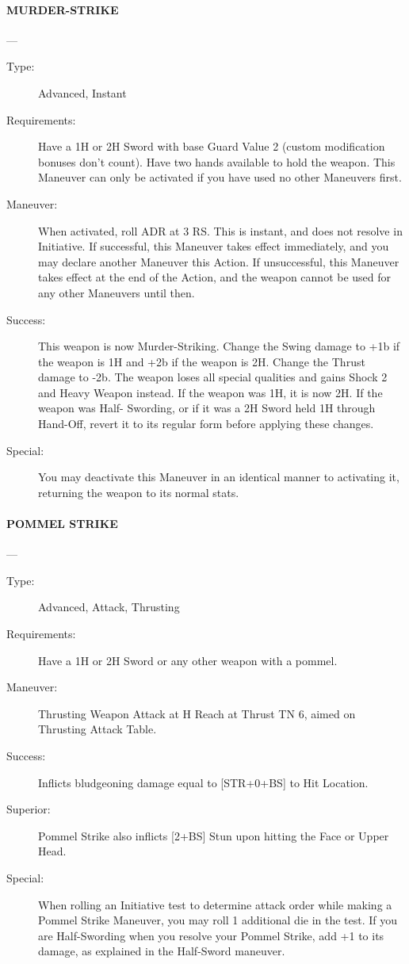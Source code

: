 \documentclass[oneside,11pt,english]{book}
\begin{document}
\paragraph{\large\label{man:MURDER-STRIKE} MURDER-STRIKE}---\quad{\large[2]}
\vspace{-10pt}\begin{description} 
\item [Type:] Advanced, Instant 
\item [Requirements:] Have a 1H or 2H Sword with base Guard Value 2 (custom modification bonuses don’t 
count). Have two hands available to hold the weapon. This Maneuver can only be activated if you have 
used no other Maneuvers first. 
\item [Maneuver:] When activated, roll ADR at 3 RS. This is instant, and does not resolve in Initiative. If 
successful, this Maneuver takes effect immediately, and you may declare another Maneuver this Action. 
If unsuccessful, this Maneuver takes effect at the end of the Action, and the weapon cannot be used for 
any other Maneuvers until then. 
\item [Success:] This weapon is now Murder-Striking. Change the Swing damage to +1b if the weapon is 1H and 
+2b if the weapon is 2H. Change the Thrust damage to -2b. The weapon loses all special qualities and 
gains Shock 2 and Heavy Weapon instead. If the weapon was 1H, it is now 2H. If the weapon was Half-
Swording, or if it was a 2H Sword held 1H through Hand-Off, revert it to its regular form before applying 
these changes. 
\item [Special:] You may deactivate this Maneuver in an identical manner to activating it, returning the weapon 
to its normal stats. 
\end{description}
\paragraph{\large\label{man:POMMEL STRIKE} POMMEL STRIKE}---\quad{\large[X]}
\vspace{-10pt}\begin{description} 
\item [Type:] Advanced, Attack, Thrusting 
\item [Requirements:] Have a 1H or 2H Sword or any other weapon with a pommel. 
\item [Maneuver:] Thrusting Weapon Attack at H Reach at Thrust TN 6, aimed on Thrusting Attack Table. 
\item [Success:] Inflicts bludgeoning damage equal to [STR+0+BS] to Hit Location. 
\item [Superior:] Pommel Strike also inflicts [2+BS] Stun upon hitting the Face or Upper Head. 
\item [Special:] When rolling an Initiative test to determine attack order while making a Pommel Strike 
Maneuver, you may roll 1 additional die in the test. If you are Half-Swording when you resolve your 
Pommel Strike, add +1 to its damage, as explained in the Half-Sword maneuver. 
\end{description}
\end{document}
